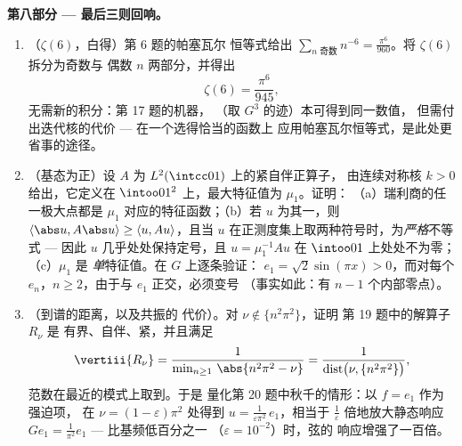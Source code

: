 \begin{problem}
\medskip
\noindent\textbf{第八部分 --- 最后三则回响。}
\begin{enumerate}[resume]
  \item （$\zeta(6)$，白得）第 6 题的帕塞瓦尔
        恒等式给出 $\sum_{n\text{ 奇数}}n^{-6} =
        \frac{\pi^6}{960}$。将 $\zeta(6)$ 拆分为奇数与
        偶数 $n$ 两部分，并得出
        \[
        \zeta(6) = \frac{\pi^6}{945},
        \]
        无需新的积分：第 17 题的机器，
        （取 $G^3$ 的迹）本可得到同一数值，
        但需付出迭代核的代价 --- 在一个选得恰当的函数上
        应用帕塞瓦尔恒等式，是此处更省事的途径。
  \item （基态为正）设 $A$ 为
        $L^2(\intcc01)$ 上的紧自伴正算子，
        由连续对称核 $k > 0$ 给出，它定义在
        $\intoo01^2$ 上，最大特征值为 $\mu_1$。证明：
        （a）瑞利商的任一极大点都是
        $\mu_1$ 对应的特征函数；（b）若 $u$ 为其一，则
        $\langle\abs u, A\abs u\rangle \geq \langle u,
        Au\rangle$，且当 $u$ 在正测度集上取两种符号时，为\emph{严格}不等式 ---
        因此 $u$
        几乎处处保持定号，且 $u = \mu_1^{-1}Au$
        在 $\intoo01$ 上处处不为零；（c）$\mu_1$ 是
        \emph{单}特征值。在 $G$ 上逐条验证：
        $e_1 = \sqrt2\sin(\pi x) > 0$，而对每个 $e_n$，$n
        \geq 2$，由于与 $e_1$ 正交，必须变号
        （事实如此：有 $n - 1$ 个内部零点）。
  \item （到谱的距离，以及共振的
        代价）。对 $\nu \notin \{n^2\pi^2\}$，证明
        第 19 题中的解算子 $R_\nu$ 是
        有界、自伴、紧，并且满足
        \[
        \vertiii{R_\nu} =
        \frac1{\min_{n\geq1}\,\abs{n^2\pi^2 - \nu}}
        = \frac1{\operatorname{dist}\bigl(\nu,
        \{n^2\pi^2\}\bigr)},
        \]
        范数在最近的模式上取到。于是
        量化第 20 题中秋千的情形：以 $f = e_1$ 作为强迫项，
        在 $\nu = (1 - \varepsilon)\pi^2$ 处得到 $u =
        \frac{1}{\varepsilon\pi^2}\,e_1$，相当于
        $\frac1\varepsilon$ 倍地放大静态响应 $Ge_1 =
        \frac1{\pi^2}e_1$ --- 比基频低百分之一
        （$\varepsilon = 10^{-2}$）时，弦的
        响应增强了一百倍。
\end{enumerate}
\end{problem}
